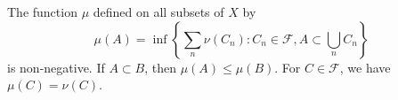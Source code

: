 The function $\mu$ defined on all subsets of $X$ by
$$\mu(A) = \inf \left\{ \sum_n \nu(C_n) : C_n \in \mathcal{F}, A \subset \bigcup_n C_n \right\}$$
is non-negative. If $A \subset B$, then $\mu(A) \leq \mu(B)$. For $C \in \mathcal{F}$, we have $\mu(C) = \nu(C)$.
